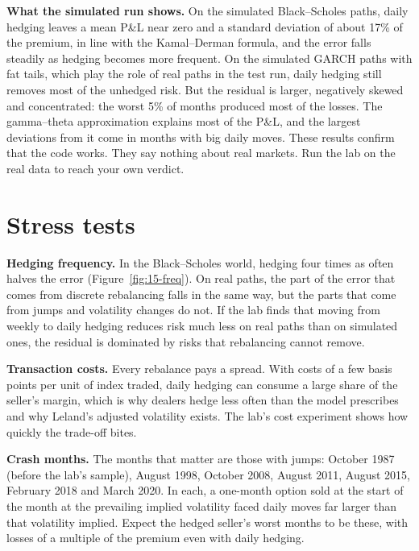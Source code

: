 \textbf{What the simulated run shows.} On the simulated Black--Scholes paths, daily hedging leaves a mean P\&L near zero and a standard deviation of about 17\% of the premium, in line with the Kamal--Derman formula, and the error falls steadily as hedging becomes more frequent. On the simulated GARCH paths with fat tails, which play the role of real paths in the test run, daily hedging still removes most of the unhedged risk. But the residual is larger, negatively skewed and concentrated: the worst 5\% of months produced most of the losses. The gamma--theta approximation explains most of the P\&L, and the largest deviations from it come in months with big daily moves. These results confirm that the code works. They say nothing about real markets. Run the lab on the real data to reach your own verdict.

\section{Stress tests}
\label{sec:15-stress}

\textbf{Hedging frequency.} In the Black--Scholes world, hedging four times as often halves the error (Figure~\ref{fig:15-freq}). On real paths, the part of the error that comes from discrete rebalancing falls in the same way, but the parts that come from jumps and volatility changes do not. If the lab finds that moving from weekly to daily hedging reduces risk much less on real paths than on simulated ones, the residual is dominated by risks that rebalancing cannot remove.

\textbf{Transaction costs.} Every rebalance pays a spread. With costs of a few basis points per unit of index traded, daily hedging can consume a large share of the seller's margin, which is why dealers hedge less often than the model prescribes and why Leland's adjusted volatility exists. The lab's cost experiment shows how quickly the trade-off bites.

\textbf{Crash months.} The months that matter are those with jumps: October 1987 (before the lab's sample), August 1998, October 2008, August 2011, August 2015, February 2018 and March 2020. In each, a one-month option sold at the start of the month at the prevailing implied volatility faced daily moves far larger than that volatility implied. Expect the hedged seller's worst months to be these, with losses of a multiple of the premium even with daily hedging.

